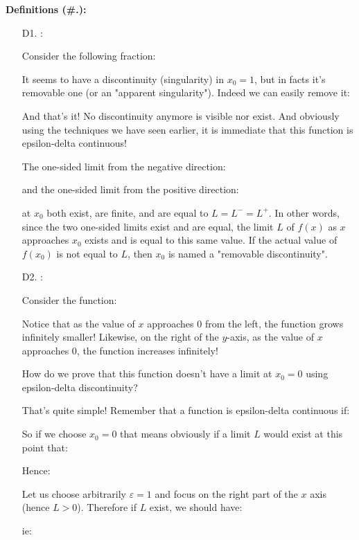 	\textbf{Definitions (\#\thesection.\mydef):}
	\begin{itemize}
		\item[D1.] \label{removable discontinuity}:
		
		Consider the following fraction:
		
		It seems to have a discontinuity (singularity) in $x_0=1$, but in facts it's removable one (or an "apparent singularity"). Indeed we can easily remove it:
		
		And that's it! No discontinuity anymore is visible nor exist. And obviously using the techniques we have seen earlier, it is immediate that this function is epsilon-delta continuous!
		
		The one-sided limit from the negative direction:
		
		and the one-sided limit from the positive direction:
		
		at $x_0$ both exist, are finite, and are equal to $L=L^{-}=L^{+}$. In other words, since the two one-sided limits exist and are equal, the limit $L$ of $f(x)$ as $x$ approaches $x_0$ exists and is equal to this same value. If the actual value of $f\left(x_0\right)$ is not equal to $L$, then $x_0$ is named a "removable discontinuity". 
		
		\item[D2.] \label{infinite discontinuity}:
		
		Consider the function:
		
		Notice that as the value of $x$ approaches $0$ from the left, the function grows infinitely smaller! Likewise, on the right of the $y$-axis, as the value of 
$x$ approaches $0$, the function increases infinitely!

		How do we prove that this function doesn't have a limit at $x_0=0$ using epsilon-delta discontinuity? 
		
		That's quite simple! Remember that a function is epsilon-delta continuous if:
		
		So if we choose $x_0=0$ that means obviously if a limit $L$ would exist at this point that:
		
		Hence:
		
		Let us choose arbitrarily $\varepsilon=1$ and focus on the right part of the $x$ axis (hence $L>0$). Therefore if $L$ exist, we should have:
		
		ie:
		

\end{itemize}
